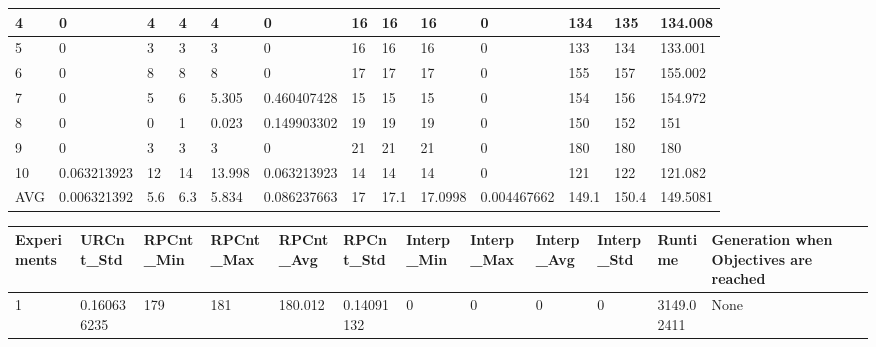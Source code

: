 \begin{table}[H]
\begin{adjustbox}{max width=480pt,keepaspectratio,angle=90}
\begin{tabular}{|l|l|l|l|l|l|l|l|l|l|l|l|l|}
						4           & 0           & 4         & 4         & 4         & 0           & 16           & 16           & 16           & 0            & 134        & 135        & 134.008    \\ \hline
						5           & 0           & 3         & 3         & 3         & 0           & 16           & 16           & 16           & 0            & 133        & 134        & 133.001    \\ \hline
						6           & 0           & 8         & 8         & 8         & 0           & 17           & 17           & 17           & 0            & 155        & 157        & 155.002    \\ \hline
						7           & 0           & 5         & 6         & 5.305     & 0.460407428 & 15           & 15           & 15           & 0            & 154        & 156        & 154.972    \\ \hline
						8           & 0           & 0         & 1         & 0.023     & 0.149903302 & 19           & 19           & 19           & 0            & 150        & 152        & 151        \\ \hline
						9           & 0           & 3         & 3         & 3         & 0           & 21           & 21           & 21           & 0            & 180        & 180        & 180        \\ \hline
						10          & 0.063213923 & 12        & 14        & 13.998    & 0.063213923 & 14           & 14           & 14           & 0            & 121        & 122        & 121.082    \\ \hline
						AVG         & 0.006321392 & 5.6       & 6.3       & 5.834     & 0.086237663 & 17           & 17.1         & 17.0998      & 0.004467662  & 149.1      & 150.4      & 149.5081   \\ \hline
					\end{tabular}
				\end{adjustbox}
				\begin{adjustbox}{max width=460pt,keepaspectratio,angle=90}
					\begin{tabular}{|l|l|l|l|l|l|l|l|l|l|l|l|}
						\hline
						\rowcolor[HTML]{EFEFEF} 
						Experiments & URCnt\_Std  & RPCnt\_Min & RPCnt\_Max & RPCnt\_Avg & RPCnt\_Std  & Interp\_Min & Interp\_Max & Interp\_Avg & Interp\_Std & Runtime     & Generation when Objectives are reached \\ \hline
						1           & 0.160636235 & 179        & 181        & 180.012    & 0.14091132  & 0           & 0           & 0           & 0           & 3149.02411  & None                                   \\ \hline

\end{tabular}
\end{adjustbox}
\end{table}
